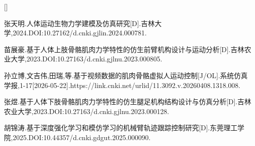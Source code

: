 \begin{list}{[]}{\setlength{\leftmargin}{2.6em}\setlength{\labelwidth}{2.2em}\setlength{\labelsep}{0.4em}\setlength{\itemsep}{0pt}\setlength{\parsep}{0pt}}
\item 张天明.人体运动生物力学建模及仿真研究[D].吉林大学,2024.DOI:10.27162/d.cnki.gjlin.2024.000781.
\item 苗展豪.基于人体上肢骨骼肌肉力学特性的仿生前臂机构设计与运动分析[D].吉林农业大学,2023.DOI:10.27163/d.cnki.gjlnu.2023.000805.
\item 孙立博,文吉伟,田瑞,等.基于视频数据的肌肉骨骼虚拟人运动控制[J/OL].系统仿真学报,1-17[2026-05-22].https://link.cnki.net/urlid/11.3092.v.20260408.1318.008.
\item 张煜.基于人体下肢骨骼肌肉力学特性的仿生腿足机构结构设计与仿真分析[D].吉林农业大学,2023.DOI:10.27163/d.cnki.gjlnu.2023.000128.
\item 胡锦涛.基于深度强化学习和模仿学习的机械臂轨迹跟踪控制研究[D].东莞理工学院,2025.DOI:10.44357/d.cnki.gdgut.2025.000090.
\end{list}
